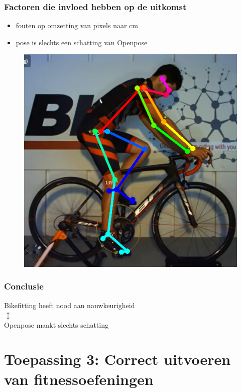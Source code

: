 \documentclass
   [kulak] %
   {kulakbeamer}
\begin{document}
\begin{frame}
\begin{figure}
\begin{minipage}[b]{.5\linewidth}
			\label{fig:1b}
		\end{minipage}
	\end{figure}
\end{frame}

\begin{frame}
	\frametitle{Factoren die invloed hebben op de uitkomst}
	\begin{itemize}
		\item fouten op omzetting van pixels naar \si{cm}
		\item pose is slechts een schatting van Openpose
	\end{itemize}
	\begin{figure}
		\includegraphics[width= .55\textwidth]{prof_bikefit}
	\end{figure}
\end{frame}

\begin{frame}
\frametitle{Conclusie}

\begin{center}
	Bikefitting heeft nood aan nauwkeurigheid\\
	$\updownarrow$ \\
	Openpose maakt slechts schatting
\end{center}


\end{frame}

\section{Toepassing 3: Correct uitvoeren van fitnessoefeningen}
\end{document}
